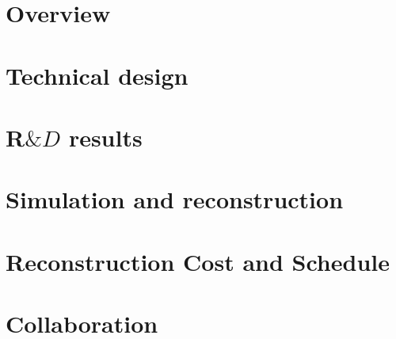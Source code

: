 \documentclass[12pt]{revtex4}
\begin{document}
%
\tableofcontents
\vfill\eject
\section{Overview}

\section{Technical design}
\section{R$\&D$ results}
\section{Simulation and reconstruction}
\section{Reconstruction Cost and Schedule}
\section{Collaboration}
%
\end{document}
